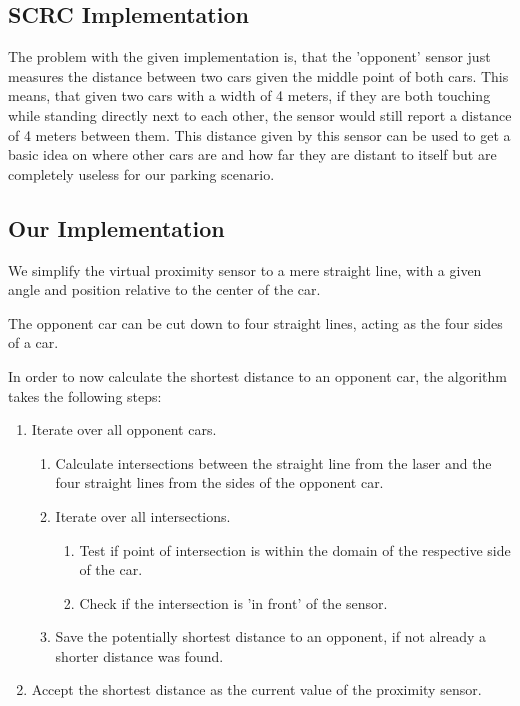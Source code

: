 \documentclass[paper=a4, fontsize=11pt]{scrreprt}
\begin{document}
\subsection{SCRC Implementation}
The problem with the given implementation is,
that the 'opponent' sensor just measures the distance between two cars given the middle point of both cars.
This means, that given two cars with a width of 4 meters,
if they are both touching while standing directly next to each other,
the sensor would still report a distance of 4 meters between them.
This distance given by this sensor can be used to get a basic idea on where other cars are
and how far they are distant to itself but are completely useless for our parking scenario.

\subsection{Our Implementation}
We simplify the virtual proximity sensor to a mere straight line,
with a given angle and position relative to the center of the car.

The opponent car can be cut down to four straight lines,
acting as the four sides of a car.

In order to now calculate the shortest distance to an opponent car,
the algorithm takes the following steps:

\begin{enumerate}
  \item Iterate over all opponent cars.
  \begin{enumerate}
    \item Calculate intersections between the straight line from the laser
    and the four straight lines from the sides of the opponent car.
    \item Iterate over all intersections.
    \begin{enumerate}
      \item Test if point of intersection is within the domain of the respective side of the car.
      \item\label{infront} Check if the intersection is 'in front' of the sensor.
    \end{enumerate}
    \item Save the potentially shortest distance to an opponent, if not already a shorter distance was found.
  \end{enumerate}
  \item Accept the shortest distance as the current value of the proximity sensor.
\end{enumerate}
\end{document}
